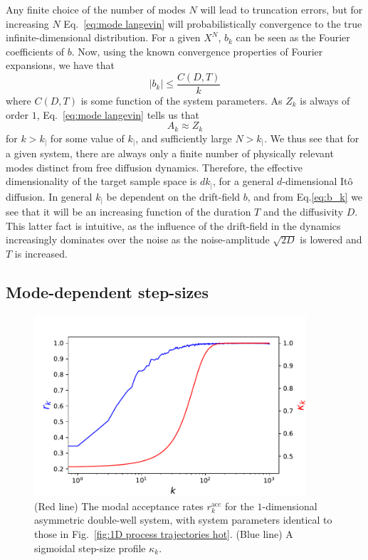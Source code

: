 Any finite choice of the number of modes $N$ will lead to truncation errors, but for increasing $N$ Eq.~\ref{eq:mode langevin} will probabilistically convergence to the true infinite-dimensional distribution. For a given $X^N$, $b_k$ can be seen as the Fourier coefficients of $b$. Now, using the known convergence properties of Fourier expansions, we have that
\begin{equation}
	|b_k| \leq \frac{C(D, T)}{k}
\end{equation}
where $C(D, T)$ is some function of the system parameters. As $Z_k$ is always of order $1$, Eq.~\ref{eq:mode langevin} tells us that
\begin{equation}
	A_k \approx Z_k
\end{equation}
for $k > k_|$ for some value of $k_|$, and sufficiently large $N > k_|$. We thus see that for a given system, there are always only a finite number of physically relevant modes distinct from free diffusion dynamics. Therefore, the effective dimensionality of the target sample space is $dk_|$, for a general $d$-dimensional It\^{o} diffusion. In general $k_|$ be dependent on the drift-field $b$, and from Eq.\ref{eq:b_k} we see that it will be an increasing function of the duration $T$ and the diffusivity $D$. This latter fact is intuitive, as the influence of the drift-field in the dynamics increasingly dominates over the noise as the noise-amplitude $\sqrt{2 D}$ is lowered and $T$ is increased.

\subsection{Mode-dependent step-sizes} \label{sec:Mode-dependent step-sizes}

\begin{figure}[t]
\includegraphics[width=0.9\textwidth]{figs_part1/mcmc/1D_process_acceptance_rate}
\centering \caption{ (Red line) The modal acceptance rates $r^\text{acc}_k$  for the $1$-dimensional asymmetric double-well system, with system parameters identical to those in Fig.~\ref{fig:1D process trajectories hot}. (Blue line) A sigmoidal step-size profile $\kappa_k$.}
\label{fig:1D process acceptance rate} 
\end{figure}


